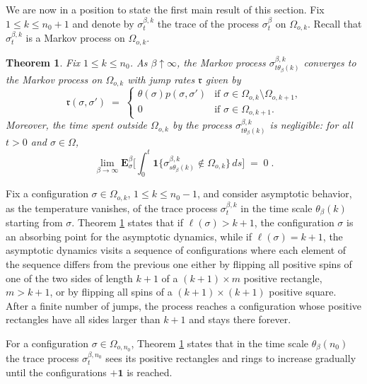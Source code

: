 \documentclass[reqno]{amsart}
\newtheorem{theorem}{Theorem}[section]
\begin{document}
We are now in a position to state the first main result of this
section.  Fix $1\le k\le n_0+1$ and denote by $\sigma^{\beta,k}_{t}$
the trace of the process $\sigma^\beta_t$ on $\Omega_{o,k}$. Recall
that $\sigma^{\beta,k}_{t}$ is a Markov process on $\Omega_{o,k}$.

\begin{theorem}
\label{t04}
Fix $1\le k\le n_0$. As $\beta\uparrow\infty$, the Markov process
$\sigma^{\beta,k}_{t \theta_\beta (k)}$ converges to the Markov
process on $\Omega_{o,k}$ with jump rates ${{\mathfrak r}}$ given by
\begin{equation*}
{{\mathfrak r}}(\sigma, \sigma') \;=\;
\begin{cases}
\theta(\sigma) p(\sigma, \sigma') &\text{if $\sigma \in \Omega_{o,k}
\setminus \Omega_{o,k+1}$,} \\
0 &\text{if $\sigma \in \Omega_{o,k+1}$.}
\end{cases}
\end{equation*}
Moreover, the time spent outside $\Omega_{o,k}$ by the process
$\sigma^{\beta,k}_{t \theta_\beta (k)}$ is negligible: for all $t>0$
and $\sigma\in \Omega$,
\begin{equation*}
\lim_{\beta\to\infty} {{\mathbf E}}^\beta_\sigma \Big[ \int_0^t {{\mathbf 1}}\{ 
\sigma^{\beta,k}_{s \theta_\beta (k)} \not\in \Omega_{o,k} \}\, ds 
\Big]\;=\; 0\;. 
\end{equation*}
\end{theorem}

Fix a configuration $\sigma \in \Omega_{o,k}$, $1\le k\le n_0-1$, and
consider asymptotic behavior, as the temperature vanishes, of the
trace process $\sigma^{\beta,k}_{t}$ in the time scale $\theta_\beta
(k)$ starting from $\sigma$. Theorem \ref{t04} states that if
$\ell(\sigma)>k+1$, the configuration $\sigma$ is an absorbing point
for the asymptotic dynamics, while if $\ell(\sigma)=k+1$, the
asymptotic dynamics visits a sequence of configurations where each
element of the sequence differs from the previous one either by
flipping all positive spins of one of the two sides of length $k+1$ of
a $(k+1)\times m$ positive rectangle, $m>k+1$, or by flipping all
spins of a $(k+1)\times (k+1)$ positive square. After a finite number
of jumps, the process reaches a configuration whose positive
rectangles have all sides larger than $k+1$ and stays there forever.

For a configuration $\sigma \in \Omega_{o,n_0}$, Theorem \ref{t04}
states that in the time scale $\theta_\beta (n_0)$ the trace process
$\sigma^{\beta,n_0}_{t}$ sees its positive rectangles and rings to
increase gradually until the configurations $+ {{\mathbf 1}}$ is reached.
\end{document}
